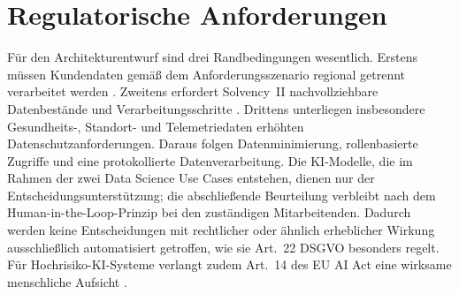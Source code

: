 \section{Regulatorische Anforderungen}
\label{sec:regulatorik}

Für den Architekturentwurf sind drei Randbedingungen wesentlich. Erstens
müssen Kundendaten gemäß dem Anforderungsszenario regional getrennt
verarbeitet werden \citep[Folien~5, 17]{nordakademieSzenarioVersicherung}.
Zweitens erfordert Solvency~II nachvollziehbare Datenbestände und
Verarbeitungsschritte \citep{euSolvencyII}. Drittens unterliegen insbesondere
Gesundheits-, Standort- und Telemetriedaten erhöhten
Datenschutzanforderungen. Daraus folgen Datenminimierung, rollenbasierte
Zugriffe und eine protokollierte Datenverarbeitung. Die KI-Modelle, 
die im Rahmen der zwei Data Science Use Cases entstehen, dienen nur der
Entscheidungsunterstützung; die abschließende Beurteilung verbleibt nach dem
Human-in-the-Loop-Prinzip bei den zuständigen Mitarbeitenden. Dadurch werden
keine Entscheidungen mit rechtlicher oder ähnlich erheblicher Wirkung
ausschließlich automatisiert getroffen, wie sie Art.~22 DSGVO besonders
regelt. Für Hochrisiko-KI-Systeme verlangt zudem Art.~14 des EU AI Act eine
wirksame menschliche Aufsicht \citep{euGDPR,euAIAct}.
